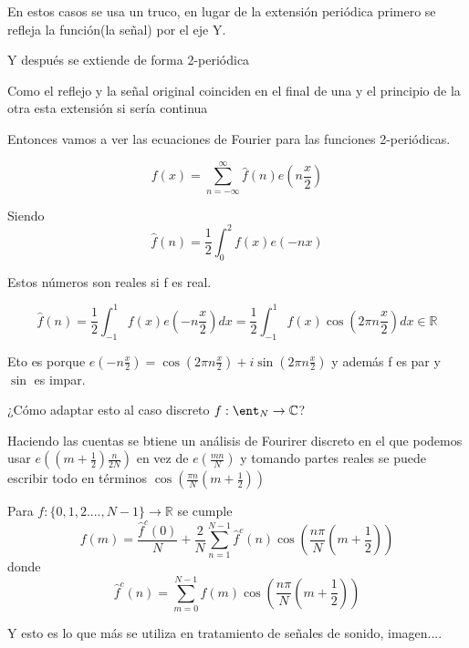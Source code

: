 	En estos casos se usa un truco, en lugar de la extensión periódica primero se refleja la función(la señal) por el eje Y.

	Y después se extiende de forma 2-periódica

	Como el reflejo y la señal original coinciden en el final de una y el principio de la otra esta extensión si sería continua


	\begin{center}
		\centering
	\end{center}


	Entonces vamos a ver las ecuaciones de Fourier para las funciones 2-periódicas.

	$$f(x) = \sum_{n=-\infty}^{\infty} \widehat{f}(n)e(n\frac{x}{2})$$

	Siendo
	$$\widehat{f}(n) = \frac{1}{2} \int_{0}^{2} f(x) e(-nx)$$

	Estos números son reales si f es real.

	$$\widehat{f}(n) = \frac{1}{2} \int_{-1}^{1} f(x) e(-n\frac{x}{2}) dx = \frac{1}{2} \int_{-1}^{1} f(x)\cos(2\pi n \frac{x}{2})dx \in \mathbb{R}$$

	Eto es porque $e(-n\frac{x}{2}) = \cos(2\pi n \frac{x}{2}) + i \sin(2\pi n \frac{x}{2})$ y además f es par y $\sin$ es impar.

	¿Cómo adaptar esto al caso discreto $f: \ent_N \rightarrow \mathbb{C}$?

	\begin{center}
		\centering
	\end{center}

	Haciendo las cuentas se btiene un análisis de Fourirer discreto en el que podemos usar $e((m + \frac{1}{2}) \frac{n}{2N})$ en vez de $e(\frac{mn}{N})$ y tomando partes reales se puede escribir todo en términos $\cos(\frac{\pi n}{N}(m+ \frac{1}{2}))$

	\begin{prop}
		Para $f : \{0,1,2....,N-1\} \rightarrow \mathbb{R}$ se cumple
		$$f(m) = \frac{\widehat{f}^c(0)}{N} + \frac{2}{N} \sum_{n=1}^{N-1} \widehat{f}^c(n) \cos(\frac{n\pi}{N}(m + \frac{1}{2}))$$
		donde
		$$\widehat{f}^c(n)= \sum_{m= 0}^{N-1} f(m) \cos(\frac{n\pi}{N}(m+ \frac{1}{2}))$$
	\end{prop}
	\begin{obs} Y esto es lo que más se utiliza en tratamiento de señales de sonido, imagen....
	\end{obs}

